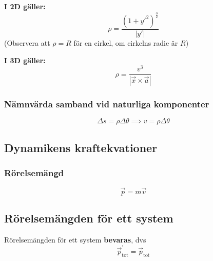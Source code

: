\documentclass{article}
\newenvironment{ankiflashcard}[1]{}{}
\begin{document}
\begin{paracol}{2}
\begin{ankiflashcard}{Ställ upp formeln för krökningsradie (2D)}
\textbf{I 2D gäller:}
$$
\rho = \frac{(1+y'^2)^{\frac{3}{2}}}{\left| y' \right|}
$$
(Observera att $\rho = R$ för en cirkel, om cirkelns radie är $R$)
\end{ankiflashcard}

\begin{ankiflashcard}{Ställ upp formeln för krökningsradie (3D)}
    
\textbf{I 3D gäller:}
$$
\rho = \frac{v^3}{\left| \vec x \times \vec a \right|}
$$
\end{ankiflashcard}

\subsubsection{Nämnvärda samband vid naturliga komponenter}

\begin{ankiflashcard}{Hur definieras hastighet i naturliga kompontenter? (trevligt trick)}
    $$
    \Delta s = \rho \Delta \theta
    \implies v = \rho \Delta \theta   $$
\end{ankiflashcard}
\subsection{Dynamikens kraftekvationer}

\begin{ankiflashcard}{Definiera rörelsemängd}
    
\subsubsection{Rörelsemängd}
$$\vec p = m \vec v$$
\end{ankiflashcard}

\begin{ankiflashcard}{Vad är sant om rörelsemängdslagen för ett system?}
\subsection{Rörelsemängden för ett system}
Rörelsemängden för ett system \textbf{bevaras}, dvs
$$\vec p_{\text{tot}}^{\prime} = \vec p_{\text{tot}}$$
\end{ankiflashcard}



\end{paracol}
\end{document}
